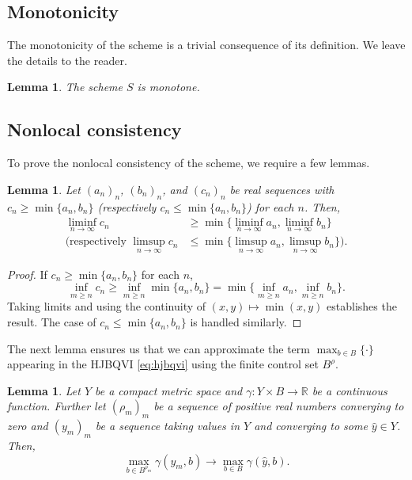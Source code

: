 \documentclass[12pt]{article}
\newcounter{dummy}
\newtheorem{lemma}[dummy]{Lemma}
\begin{document}
\subsection{Monotonicity}

The monotonicity of the scheme is a trivial consequence of its definition.
We leave the details to the reader.
\begin{lemma}
The scheme $S$ is monotone.
\end{lemma}

\subsection{Nonlocal consistency}

To prove the nonlocal consistency of the scheme, we require a few
lemmas. 
\begin{lemma}
\label{lem:commute}Let $(a_{n})_{n}$, $(b_{n})_{n}$, and $(c_{n})_{n}$
be real sequences with $c_{n}{\geqslant}\min\{a_{n},b_{n}\}$ (respectively
$c_{n}{\leqslant}\min\{a_{n},b_{n}\}$) for each $n$. Then,
\begin{align*}
\liminf_{n\rightarrow\infty}c_{n} & {\geqslant}\min\{\liminf_{n\rightarrow\infty}a_{n},\liminf_{n\rightarrow\infty}b_{n}\}\\
\text{(respectively }\limsup_{n\rightarrow\infty}c_{n} & {\leqslant}\min\{\limsup_{n\rightarrow\infty}a_{n},\limsup_{n\rightarrow\infty}b_{n}\}\text{)}.
\end{align*}
\end{lemma}
\begin{proof}
If $c_{n}{\geqslant}\min\{a_{n},b_{n}\}$ for each $n$,
\[
\inf_{m{\geqslant} n}c_{n}{\geqslant}\inf_{m{\geqslant} n}\min\{a_{n},b_{n}\}=\min\{\inf_{m{\geqslant} n}a_{n},\inf_{m{\geqslant} n}b_{n}\}.
\]
Taking limits and using the continuity of $(x,y)\mapsto\min(x,y)$
establishes the result. The case of $c_{n}{\leqslant}\min\{a_{n},b_{n}\}$
is handled similarly.
\end{proof}
The next lemma ensures us that we can approximate the term $\max_{b\in B}\{\cdot\}$
appearing in the HJBQVI \eqref{eq:hjbqvi} using the finite control
set $B^\rho$.
\begin{lemma}
\label{lem:cluster_point}Let $Y$ be a compact metric space and $\gamma:Y\times B\rightarrow\mathbb{R}$
be a continuous function. Further let $(\rho_{m})_{m}$ be a sequence
of positive real numbers converging to zero and $(y_{m})_{m}$ be
a sequence taking values in $Y$ and converging to some $\hat{y}\in Y$.
Then, 
\[
\max_{b\in B^{\rho_{m}}}\gamma(y_{m},b)\rightarrow\max_{b\in B}\gamma(\hat{y},b).
\]
\end{lemma}
\end{document}
